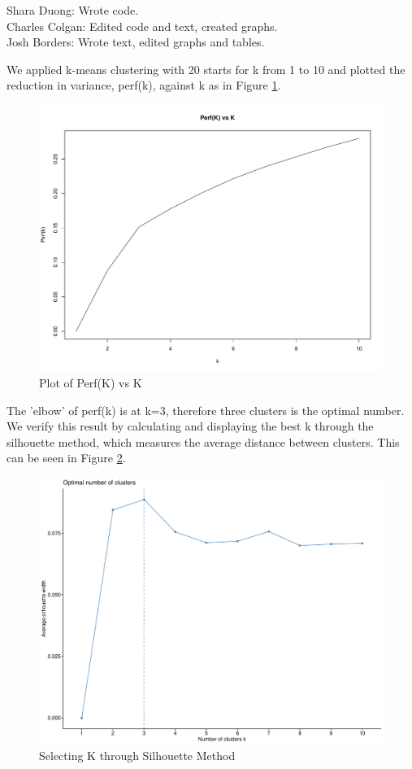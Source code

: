 \documentclass{homework}
\begin{document}
\maketitle
Shara Duong: Wrote code. \\
Charles Colgan: Edited code and text, created graphs.\\
Josh Borders: Wrote text, edited graphs and tables.

\question %
We applied k-means clustering with 20 starts for k from 1 to 10 and plotted the reduction in variance, perf(k), against k as in Figure \ref{Perfk}.

\begin{figure}[h]
    \centering
    \includegraphics[width=12cm]{graphs/HW4_bestk1.pdf}
    \caption{Plot of Perf(K) vs K}
    \label{Perfk}
\end{figure}

The 'elbow' of perf(k) is at k=3, therefore three clusters is the optimal number. We verify this result by calculating and displaying the best k through the silhouette method, which measures the average distance between clusters. This can be seen in Figure \ref{Silh}. 

\begin{figure}[h]
    \centering
    \includegraphics[width=12cm]{graphs/HW4_bestk.pdf}
    \caption{Selecting K through Silhouette Method}
    \label{Silh}
\end{figure}
\end{document}
